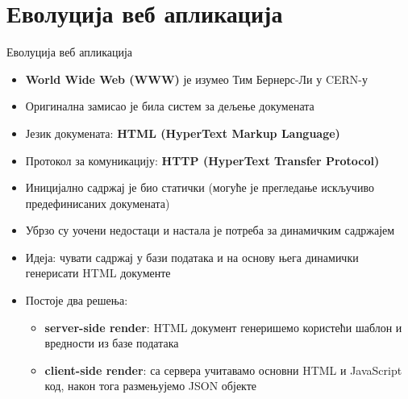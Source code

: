 \documentclass[aspectratio=169]{beamer}
\begin{document}
    \section{Еволуција веб апликација}
    
    \begin{frame}[allowframebreaks]{Еволуција веб апликација}
        \begin{itemize}
            \item \textbf{World Wide Web (WWW)} је изумео Тим Бернерс-Ли у CERN-у
            \item Оригинална замисао је била систем за дељење докумената
            \item Језик докумената: \textbf{HTML (HyperText Markup Language)}
            \item Протокол за комуникацију: \textbf{HTTP (HyperText Transfer Protocol)}
            \item Иницијално садржај је био статички (могуће је прегледање искључиво предефинисаних докумената)
            \item Убрзо су уочени недостаци и настала је потреба за динамичким садржајем
        \end{itemize}
        
        \framebreak
        
        \begin{itemize}
            \item Идеја: чувати садржај у бази података и на основу њега динамички генерисати HTML документе
            \item Постоје два решења:
            \begin{itemize}
                \item \textbf{server-side render}: HTML документ генеришемо користећи шаблон и вредности из базе података
                \item \textbf{client-side render}: са сервера учитавамо основни HTML и JavaScript код, након тога размењујемо JSON објекте
            \end{itemize}
        \end{itemize}
        
        \framebreak
        

\end{frame}
\end{document}
